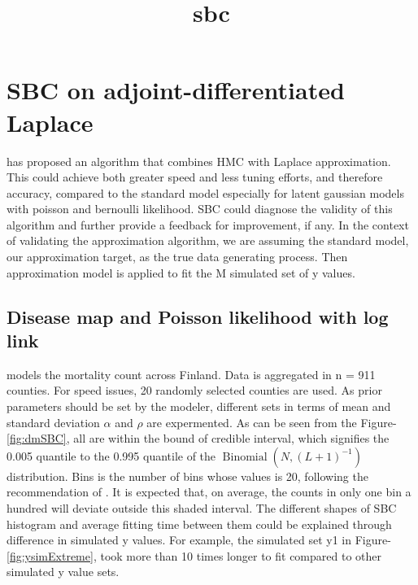 \documentclass{article}
\title{sbc}
\author{%
}
\begin{document}
\maketitle

\begin{abstract}

\end{abstract}


\section{SBC on adjoint-differentiated Laplace}

\citep{margossian2020hamiltonian} has proposed an algorithm that combines HMC with Laplace approximation. This could achieve both greater speed and less tuning efforts, and therefore accuracy, compared to the standard model especially for latent gaussian models with poisson and bernoulli likelihood. SBC could diagnose the validity of this algorithm and further provide a feedback for improvement, if any. In the context of validating the approximation algorithm, we are assuming the standard model, our approximation target, as the true data generating process. Then approximation model is applied to fit the M simulated set of y values.  


 \subsection{Disease map and Poisson likelihood with log link}
 
\citep{Vanhatalo+Pietilainen+Vehtari:2010} models the mortality count across Finland. Data is aggregated in n = 911 counties. For speed issues, 20 randomly selected counties are used. As prior parameters should be set by the modeler, different sets in terms of mean and standard deviation $\alpha$ and $\rho$ are expermented. As can be seen from the Figure-\ref{fig:dmSBC}, all are within the bound of credible interval, which signifies the 0.005 quantile to the 0.995 quantile of the $\operatorname{Binomial}\left(N,(L+1)^{-1}\right)$ distribution. Bins is the number of bins whose values is 20, following the recommendation of \citep{Talts:2018}. It is expected that, on average, the counts in only one bin a hundred will deviate outside this shaded interval. The different shapes of SBC histogram and average fitting time between them could be explained through difference in simulated y values. For example, the simulated set y1 in Figure-\ref{fig:ysimExtreme}, took more than 10 times longer to fit compared to other simulated y value sets.   
 
\end{document}
